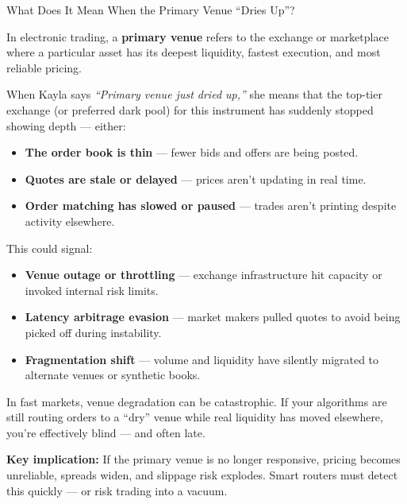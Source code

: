 \begin{TechnicalSidebar}{What Does It Mean When the Primary Venue “Dries Up”?}

  In electronic trading, a \textbf{primary venue} refers to the exchange or marketplace where a particular asset 
  has its deepest liquidity, fastest execution, and most reliable pricing.  
  
  \medskip
  
  When Kayla says \textit{“Primary venue just dried up,”} she means that the top-tier exchange (or preferred dark pool)  
  for this instrument has suddenly stopped showing depth — either:

  \medskip
  
  \begin{itemize}
    \item \textbf{The order book is thin} — fewer bids and offers are being posted.
    \item \textbf{Quotes are stale or delayed} — prices aren’t updating in real time.
    \item \textbf{Order matching has slowed or paused} — trades aren’t printing despite activity elsewhere.
  \end{itemize}
  
  \medskip
  
  This could signal:

  \medskip
  
  \begin{itemize}
    \item \textbf{Venue outage or throttling} — exchange infrastructure hit capacity or invoked internal risk limits.
    \item \textbf{Latency arbitrage evasion} — market makers pulled quotes to avoid being picked off during instability.
    \item \textbf{Fragmentation shift} — volume and liquidity have silently migrated to alternate venues or synthetic books.
  \end{itemize}
  
  \medskip
  
  In fast markets, venue degradation can be catastrophic.  
  If your algorithms are still routing orders to a “dry” venue while real liquidity has moved elsewhere, you’re effectively blind — and often late.
  
  \medskip
  
  \textbf{Key implication:} If the primary venue is no longer responsive, pricing becomes unreliable, spreads widen,  
  and slippage risk explodes. Smart routers must detect this quickly — or risk trading into a vacuum.

\end{TechnicalSidebar}


